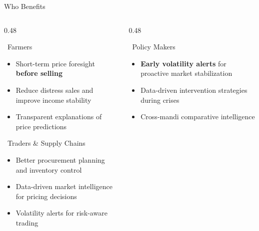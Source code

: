 \documentclass{beamer}
\begin{document}
\begin{frame}[label=benefits]{Who Benefits}

\begin{columns}[T]
\begin{column}{0.48\textwidth}

\begin{successcard}{~Farmers}
\scriptsize
\begin{itemize}\setlength\itemsep{2pt}
\item Short-term price foresight \textbf{before selling}
\item Reduce distress sales and improve income stability
\item Transparent explanations of price predictions
\end{itemize}
\end{successcard}

\vspace{0.06cm}

\begin{orangecard}{~Traders \& Supply Chains}
\scriptsize
\begin{itemize}\setlength\itemsep{2pt}
\item Better procurement planning and inventory control
\item Data-driven market intelligence for pricing decisions
\item Volatility alerts for risk-aware trading
\end{itemize}
\end{orangecard}

\end{column}
\begin{column}{0.48\textwidth}

\begin{purplecard}{~Policy Makers}
\scriptsize
\begin{itemize}\setlength\itemsep{2pt}
\item \textbf{Early volatility alerts} for proactive market stabilization
\item Data-driven intervention strategies during crises
\item Cross-mandi comparative intelligence
\end{itemize}
\end{purplecard}

\vspace{0.06cm}


\end{column}
\end{columns}
\end{frame}
\end{document}
